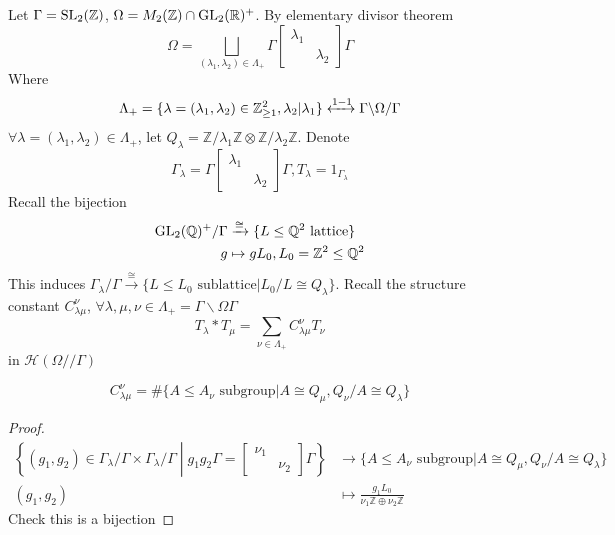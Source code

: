 \documentclass[main]{subfiles}
\begin{document}
\begin{example}
Let $\Gamma=\operatorname{SL}_2(\mathbb Z)$, $\Omega=M_2(\mathbb Z)\cap\operatorname{GL}_2(\mathbb R)^+$. By elementary divisor theorem
\[\Omega=\bigsqcup_{(\lambda_1,\lambda_2)\in\Lambda_+}\Gamma\begin{bmatrix}
\lambda_1&\\
&\lambda_2
\end{bmatrix}\Gamma\]
Where
\[\Lambda_+=\{\lambda=(\lambda_1,\lambda_2)\in\mathbb Z_{\geq1}^2,\lambda_2|\lambda_1\}\xleftrightarrow{1-1}\Gamma\backslash\Omega/\Gamma\]
$\forall\lambda=(\lambda_1,\lambda_2)\in\Lambda_+$, let $Q_\lambda=\mathbb Z/\lambda_1\mathbb Z\otimes\mathbb Z/\lambda_2\mathbb Z$. Denote
\[\Gamma_\lambda=\Gamma\begin{bmatrix}
\lambda_1&\\
&\lambda_2
\end{bmatrix}\Gamma,T_\lambda=1_{\Gamma_\lambda}\]
Recall the bijection
\begin{align*}
\operatorname{GL}_2(\mathbb Q)^+/\Gamma&\xrightarrow{\cong}\{L\leq\mathbb Q^2\text{ lattice}\} \\
g&\mapsto gL_0,L_0=\mathbb Z^2\leq\mathbb Q^2
\end{align*}
This induces $\Gamma_\lambda/\Gamma\xrightarrow{\cong}\{L\leq L_0\text{ sublattice}|L_0/L\cong Q_\lambda\}$. Recall the structure constant $C^\nu_{\lambda\mu}$, $\forall \lambda,\mu,\nu\in\Lambda_+=\Gamma\backslash\Omega\Gamma$
\[T_\lambda*T_\mu=\sum_{\nu\in\Lambda_+}C^\nu_{\lambda\mu}T_\nu\]
in $\mathscr H(\Omega//\Gamma)$
\end{example}

\begin{lemma}
\[C^\nu_{\lambda\mu}=\#\{A\leq A_\nu\text{ subgroup}|A\cong Q_\mu,Q_\nu/A\cong Q_\lambda\}\]
\end{lemma}

\begin{proof}
\begin{align*}
\left\{(g_1,g_2)\in\Gamma_\lambda/\Gamma\times\Gamma_\lambda/\Gamma\middle|g_1g_2\Gamma=\begin{bmatrix}
\nu_1&\\
&\nu_2
\end{bmatrix}\Gamma\right\}&\to\{A\leq A_\nu\text{ subgroup}|A\cong Q_\mu,Q_\nu/A\cong Q_\lambda\} \\
(g_1,g_2)&\mapsto\frac{g_1L_0}{\nu_1\mathbb Z\oplus\nu_2\mathbb Z}
\end{align*}
Check this is a bijection
\end{proof}
\end{document}
